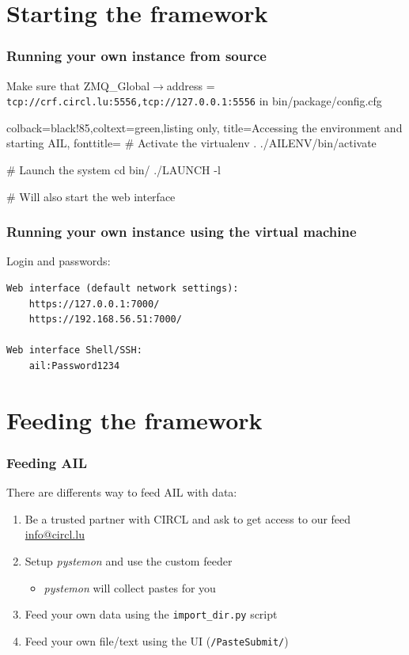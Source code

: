 \section{Starting the framework}
\lstset{style=bash}
\begin{frame}[fragile]
    \frametitle{Running your own instance from source}
    {\scriptsize Make sure that ZMQ\_Global$\rightarrow$address = \texttt{tcp://crf.circl.lu:5556,tcp://127.0.0.1:5556} in bin/package/config.cfg}
    \begin{tcblisting}{colback=black!85,coltext=green,listing only,
        title=Accessing the environment and starting AIL, fonttitle=\bfseries}
# Activate the virtualenv
. ./AILENV/bin/activate

# Launch the system
cd bin/
./LAUNCH -l

# Will also start the web interface

\end{tcblisting}
\end{frame}

\begin{frame}[fragile]
    \frametitle{Running your own instance using the virtual machine}
    Login and passwords:
    \lstset{style=default}
    \begin{lstlisting}
Web interface (default network settings):
    https://127.0.0.1:7000/
    https://192.168.56.51:7000/

Web interface Shell/SSH:
    ail:Password1234
    \end{lstlisting}
\end{frame}

\section{Feeding the framework}
\begin{frame}
\frametitle{Feeding AIL}
    There are differents way to feed AIL with data:
    \begin{enumerate}
        \item Be a trusted partner with CIRCL and ask to get access to our feed {\tiny \href{mailto:info@circl.lu}{info@circl.lu}}
        \item Setup \textit{pystemon} and use the custom feeder
            \begin{itemize}
                \item \textit{pystemon} will collect pastes for you
            \end{itemize}
        \item Feed your own data using the \texttt{import\_dir.py} script
        \item Feed your own file/text using the UI (\texttt{/PasteSubmit/})
    \end{enumerate}
\end{frame}

